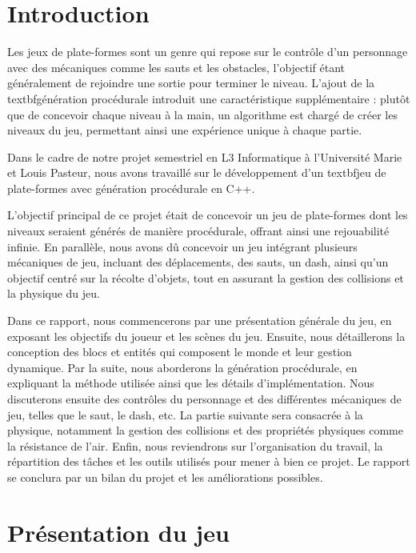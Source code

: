 \documentclass[10pt]{report}
\begin{document}
\normalsize
{}
\pagebreak
\listoffigures
\pagebreak

\section{Introduction}

Les jeux de plate-formes sont un genre qui repose sur le contrôle d'un personnage avec des mécaniques comme
les sauts et les obstacles, l’objectif étant généralement de rejoindre une sortie pour terminer le niveau.
L’ajout de la textbf{génération procédurale} introduit une caractéristique supplémentaire :
plutôt que de concevoir chaque niveau à la main, un algorithme est chargé de créer les niveaux du jeu,
permettant ainsi une expérience unique à chaque partie.

Dans le cadre de notre projet semestriel en L3 Informatique à l'Université Marie et Louis Pasteur,
nous avons travaillé sur le développement d’un textbf{jeu de plate-formes avec génération procédurale en C++}.

L'objectif principal de ce projet était de concevoir un jeu de plate-formes dont les niveaux seraient générés
de manière procédurale, offrant ainsi une rejouabilité infinie.
En parallèle, nous avons dû concevoir un jeu intégrant plusieurs mécaniques de jeu, incluant des déplacements,
des sauts, un dash, ainsi qu’un objectif centré sur la récolte d’objets, tout en assurant la gestion des collisions et la physique du jeu.

Dans ce rapport, nous commencerons par une présentation générale du jeu, en exposant les objectifs du joueur et
les scènes du jeu.
Ensuite, nous détaillerons la conception des blocs et entités qui composent le monde et leur gestion dynamique.
Par la suite, nous aborderons la génération procédurale, en expliquant la méthode utilisée ainsi que les détails
d'implémentation.
Nous discuterons ensuite des contrôles du personnage et des différentes mécaniques de jeu, telles que le saut,
le dash, etc.
La partie suivante sera consacrée à la physique, notamment la gestion des collisions et des propriétés physiques
comme la résistance de l'air.
Enfin, nous reviendrons sur l’organisation du travail, la répartition des tâches et les outils utilisés pour
mener à bien ce projet.
Le rapport se conclura par un bilan du projet et les améliorations possibles.

\pagebreak



\section{Présentation du jeu}
\end{document}
